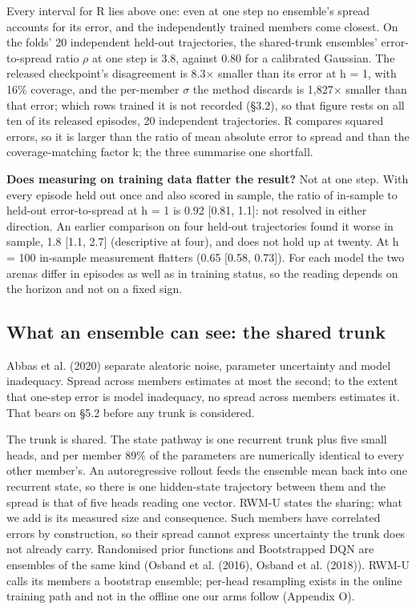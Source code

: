 \documentclass[10pt]{article}
\begin{document}
Every interval for R lies above one: even at one step no ensemble's spread accounts for its error, and the independently trained members come closest. On the folds' 20 independent held-out trajectories, the shared-trunk ensembles' error-to-spread ratio $\rho$ at one step is 3.8, against 0.80 for a calibrated Gaussian. The released checkpoint's disagreement is 8.3$\times$ smaller than its error at h = 1, with 16\% coverage, and the per-member $\sigma$ the method discards is 1,827$\times$ smaller than that error; which rows trained it is not recorded (\S{}3.2), so that figure rests on all ten of its released episodes, 20 independent trajectories. R compares squared errors, so it is larger than the ratio of mean absolute error to spread and than the coverage-matching factor k; the three summarise one shortfall.

\textbf{Does measuring on training data flatter the result?} Not at one step. With every episode held out once and also scored in sample, the ratio of in-sample to held-out error-to-spread at h = 1 is 0.92 [0.81, 1.1]: not resolved in either direction. An earlier comparison on four held-out trajectories found it worse in sample, 1.8 [1.1, 2.7] (descriptive at four), and does not hold up at twenty. At h = 100 in-sample measurement flatters (0.65 [0.58, 0.73]). For each model the two arenas differ in episodes as well as in training status, so the reading depends on the horizon and not on a fixed sign.

\subsection{What an ensemble can see: the shared trunk}

Abbas et al. (2020) separate aleatoric noise, parameter uncertainty and model inadequacy. Spread across members estimates at most the second; to the extent that one-step error is model inadequacy, no spread across members estimates it. That bears on \S{}5.2 before any trunk is considered.

The trunk is shared. The state pathway is one recurrent trunk plus five small heads, and per member 89\% of the parameters are numerically identical to every other member's. An autoregressive rollout feeds the ensemble mean back into one recurrent state, so there is one hidden-state trajectory between them and the spread is that of five heads reading one vector. RWM-U states the sharing; what we add is its measured size and consequence. Such members have correlated errors by construction, so their spread cannot express uncertainty the trunk does not already carry. Randomised prior functions and Bootstrapped DQN are ensembles of the same kind (Osband et al. (2016), Osband et al. (2018)). RWM-U calls its members a bootstrap ensemble; per-head resampling exists in the online training path and not in the offline one our arms follow (Appendix O).
\end{document}
